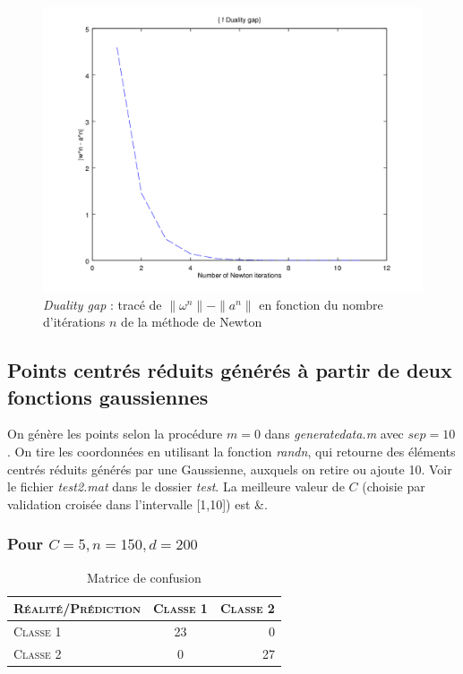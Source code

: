 \documentclass{article}
\begin{document}
         \begin{figure}
           \begin{center}
             \subfigure\includegraphics[scale=0.5]{images/duality1.png}
             \caption{\emph{Duality gap} : tracé de $\|\omega^n\| - \|a^n\|$ en fonction du nombre d'itérations $n$ de la méthode de Newton}
           \end{center}
         \end{figure}

\subsection{Points centrés réduits générés à partir de deux fonctions gaussiennes}

On génère les points selon la procédure $m = 0$ dans \emph{generatedata.m} avec $sep=10$. On tire les coordonnées en utilisant la fonction \emph{randn}, qui retourne des éléments centrés réduits générés par une Gaussienne, auxquels on retire ou ajoute 10. Voir le fichier \emph{test2.mat} dans le dossier \emph{test}. La meilleure valeur de $C$ (choisie par validation croisée dans l'intervalle [1,10]) est &.

\subsubsection{Pour $C=5, n=150, d=200$}

     \begin{table}[H]
       \caption{Matrice de confusion}
       \begin{tabular}{|l|c|r|}
         \hline
         \textsc{Réalité/Prédiction} & \textsc{Classe 1} & \textsc{Classe 2}\\
         \hline
         \textsc{Classe 1} & 23 & 0\\
         \hline
         \textsc{Classe 2} & 0 & 27\\
         \hline
       \end{tabular}
     \end{table}
\end{document}
